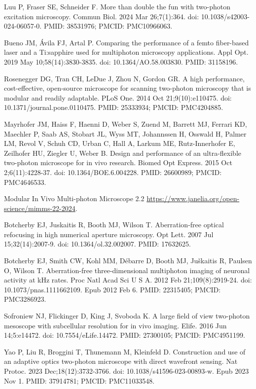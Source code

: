 \documentclass[10pt,letterpaper]{article}
\begin{document}
\begin{thebibliography}{10}
Luu P, Fraser SE, Schneider F. More than double the fun with two-photon excitation microscopy. Commun Biol. 2024 Mar 26;7(1):364. doi: 10.1038/s42003-024-06057-0. PMID: 38531976; PMCID: PMC10966063.

Bueno JM, Ávila FJ, Artal P. Comparing the performance of a femto fiber-based laser and a Ti:sapphire used for multiphoton microscopy applications. Appl Opt. 2019 May 10;58(14):3830-3835. doi: 10.1364/AO.58.003830. PMID: 31158196.

Rosenegger DG, Tran CH, LeDue J, Zhou N, Gordon GR. A high performance, cost-effective, open-source microscope for scanning two-photon microscopy that is modular and readily adaptable. PLoS One. 2014 Oct 21;9(10):e110475. doi: 10.1371/journal.pone.0110475. PMID: 25333934; PMCID: PMC4204885.

Mayrhofer JM, Haiss F, Haenni D, Weber S, Zuend M, Barrett MJ, Ferrari KD, Maechler P, Saab AS, Stobart JL, Wyss MT, Johannssen H, Osswald H, Palmer LM, Revol V, Schuh CD, Urban C, Hall A, Larkum ME, Rutz-Innerhofer E, Zeilhofer HU, Ziegler U, Weber B. Design and performance of an ultra-flexible two-photon microscope for in vivo research. Biomed Opt Express. 2015 Oct 2;6(11):4228-37. doi: 10.1364/BOE.6.004228. PMID: 26600989; PMCID: PMC4646533.

Modular In Vivo Multi-photon Microscope 2.2 \url{https://www.janelia.org/open-science/mimms-22-2024}.

Botcherby EJ, Juskaitis R, Booth MJ, Wilson T. Aberration-free optical refocusing in high numerical aperture microscopy. Opt Lett. 2007 Jul 15;32(14):2007-9. doi: 10.1364/ol.32.002007. PMID: 17632625.

Botcherby EJ, Smith CW, Kohl MM, Débarre D, Booth MJ, Juškaitis R, Paulsen O, Wilson T. Aberration-free three-dimensional multiphoton imaging of neuronal activity at kHz rates. Proc Natl Acad Sci U S A. 2012 Feb 21;109(8):2919-24. doi: 10.1073/pnas.1111662109. Epub 2012 Feb 6. PMID: 22315405; PMCID: PMC3286923.

Sofroniew NJ, Flickinger D, King J, Svoboda K. A large field of view two-photon mesoscope with subcellular resolution for in vivo imaging. Elife. 2016 Jun 14;5:e14472. doi: 10.7554/eLife.14472. PMID: 27300105; PMCID: PMC4951199.

Yao P, Liu R, Broggini T, Thunemann M, Kleinfeld D. Construction and use of an adaptive optics two-photon microscope with direct wavefront sensing. Nat Protoc. 2023 Dec;18(12):3732-3766. doi: 10.1038/s41596-023-00893-w. Epub 2023 Nov 1. PMID: 37914781; PMCID: PMC11033548.


\end{thebibliography}
\end{document}
